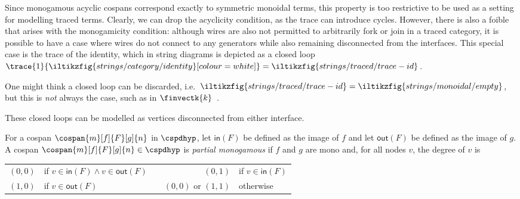 Since monogamous acyclic cospans correspond exactly to symmetric monoidal terms,
this property is too restrictive to be used as a setting for modelling traced
terms.
Clearly, we can drop the acyclicity condition, as the trace can introduce
cycles.
However, there is also a foible that arises with the monogamicity condition:
although wires are also not permitted to arbitrarily fork or join in a traced
category, it is possible to have a case where wires do not connect to
any generators while also remaining disconnected from the interfaces.
This special case is the trace of the identity, which in string diagrams is
depicted as a closed
loop \(
\trace{1}{\iltikzfig{strings/category/identity}[colour=white]}
=
\iltikzfig{strings/traced/trace-id}
\).

\begin{remark}
    One might think a closed loop can be discarded, i.e.\ \(
    \iltikzfig{strings/traced/trace-id}
    =
    \iltikzfig{strings/monoidal/empty}
    \), but this is \emph{not} always the case, such as in
    \(\finvectk{k}\)~\cite[Sec.\ 6.1]{hasegawa1997recursion}.
\end{remark}

These closed loops can be modelled as vertices disconnected from either
interface.

\begin{definition}
    For a cospan \(\cospan{m}[f]{F}[g]{n}\) in
    \(\cspdhyp\), let \(\mathsf{in}(F)\) be defined as the image of \(f\) and
    let \(\mathsf{out}(F)\) be defined as the image of \(g\).
    A cospan \(\cospan{m}[f]{F}[g]{n} \in \cspdhyp\) is
    \emph{partial monogamous} if \(f\) and \(g\) are mono and, for all nodes
    \(v\), the degree of \(v\) is
    \begin{center}
        \begin{tabular}{rlcrl}
            \((0,0)\)
             &
            if \(v \in \mathsf{in}(F) \wedge v \in \mathsf{out}(F)\)
             &
            \quad
             &
            \((0,1)\)
             &
            if \(v \in \mathsf{in}(F)\)
            \\
            \((1,0)\)
             &
            if \(v \in \mathsf{out}(F)\)
             &
            \quad
             &
            \((0,0)\)
            or \((1,1)\)
             &
            otherwise
        \end{tabular}
    \end{center}
\end{definition}

